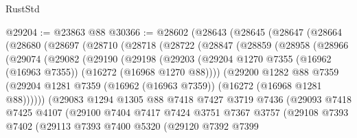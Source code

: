 \begin{lexlean}{RustStd}
\begin{coremodule}
@29204 := @23863 @88
@30366 := @28602
    (@28643
      (@28645
        (@28647
          (@28664
            (@28680
              (@28697
                (@28710
                  (@28718
                    (@28722
                      (@28847
                        (@28859
                          (@28958
                            (@28966
                              (@29074
                                (@29082
                                  (@29190
                                    (@29198
                                      (@29203
                                        (@29204
                                          @1270
                                          @7355
                                          (@16962 (@16963 @7355))
                                          (@16272 (@16968 @1270 @88))))
                                      (@29200
                                        @1282
                                        @88
                                        @7359
                                        (@29204
                                          @1281
                                          @7359
                                          (@16962 (@16963 @7359))
                                          (@16272 (@16968 @1281 @88))))))
                                  (@29083
                                    @1294
                                    @1305
                                    @88
                                    @7418
                                    @7427
                                    @3719
                                    @7436
                                    (@29093
                                      @7418
                                      @7425
                                      @4107
                                      (@29100
                                        @7404
                                        @7417
                                        @7424
                                        @3751
                                        @7367
                                        @3757
                                        (@29108
                                          @7393
                                          @7402
                                          (@29113
                                            @7393
                                            @7400
                                            @5320
                                            (@29120
                                              @7392
                                              @7399

\end{coremodule}
\end{lexlean}
